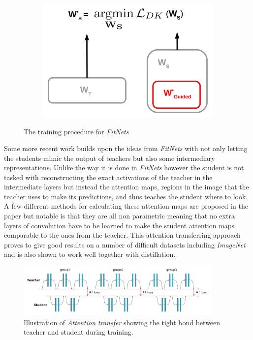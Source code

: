 \documentclass{kththesis}
\newcommand{\bibentry}[1]{\parencite{#1}}
\begin{document}
\begin{figure}[h]
    \begin{subfigure}[b]{0.3\textwidth}
        \includegraphics[width=\textwidth]{FitNet_C}
      \end{subfigure}
      \caption{The training procedure for \textit{FitNets}}\label{fig:FitNets}
      \label{fig:FitNet}
\end{figure}

Some more recent work \bibentry{zagouruyko2017paying} builds upon the ideas from
\emph{FitNets} with not only letting the students mimic the output of teachers
but also some intermediary representations. Unlike the way it is done in
\emph{FitNets} however the student is not tasked with reconstructing the exact
activations of the teacher in the intermediate layers but instead the attention
maps, regions in the image that the teacher uses to make its predictions, and
thus teaches the student where to look. A few different methods for calculating
these attention maps are proposed in the paper but notable is that they are all
non parametric meaning that no extra layers of convolution have to be learned to
make the student attention maps comparable to the ones from the teacher. This
attention transferring approach proves to give good results on a number of
difficult datasets including \emph{ImageNet} and is also shown to work well
together with distillation. 

\begin{figure}[h]
  \centering
  \includegraphics[width=0.9\textwidth]{AttentionTransfer}
  \caption{Illustration of \textit{Attention transfer} showing the tight bond
    between teacher and student during training.}
  \label{fig:AttentionTransfer}
\end{figure}
\end{document}
